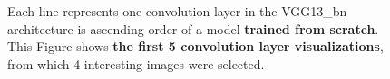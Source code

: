 \begin{figure}[!h]
\centering
\caption{Each line represents one convolution layer in the VGG13\_bn architecture is ascending order of a model \textbf{trained from scratch}. This Figure shows \textbf{the first 5 convolution layer visualizations}, from which 4 interesting images were selected.}


\end{figure}

